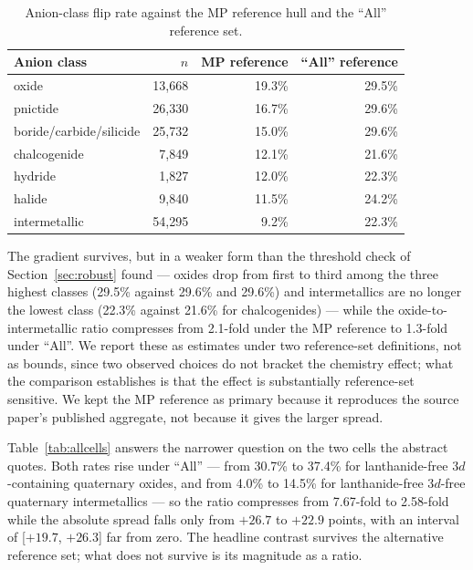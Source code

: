 \documentclass[11pt]{article}
\begin{document}
\begin{table}[htbp]\centering
\caption{Anion-class flip rate against the MP reference hull and the ``All'' reference set.}
\label{tab:allref}
\small\begin{tabular}{lrrr}
\toprule
Anion class & $n$ & MP reference & ``All'' reference \\
\midrule
oxide                   & 13{,}668 & 19.3\% & 29.5\% \\
pnictide                & 26{,}330 & 16.7\% & 29.6\% \\
boride/carbide/silicide & 25{,}732 & 15.0\% & 29.6\% \\
chalcogenide            & \phantom{0}7{,}849 & 12.1\% & 21.6\% \\
hydride                 & \phantom{0}1{,}827 & 12.0\% & 22.3\% \\
halide                  & \phantom{0}9{,}840 & 11.5\% & 24.2\% \\
intermetallic           & 54{,}295 & \phantom{0}9.2\% & 22.3\% \\
\bottomrule
\end{tabular}
\end{table}

The gradient survives, but in a weaker form than the threshold check of
Section~\ref{sec:robust} found --- oxides drop from first to third among the three
highest classes (29.5\% against 29.6\% and 29.6\%) and intermetallics are no longer the
lowest class (22.3\% against 21.6\% for chalcogenides) --- while the
oxide-to-intermetallic ratio compresses from 2.1-fold under the MP reference to 1.3-fold
under ``All''. We report these as estimates under two reference-set definitions, not as
bounds, since two observed choices do not bracket the chemistry effect; what the
comparison establishes is that the effect is substantially reference-set sensitive. We
kept the MP reference as primary because it reproduces the source paper's published aggregate,
not because it gives the larger spread.

Table~\ref{tab:allcells} answers the narrower question on the two cells the abstract
quotes. Both rates rise under ``All'' --- from 30.7\% to 37.4\% for lanthanide-free
3$d$-containing quaternary oxides, and from 4.0\% to 14.5\% for lanthanide-free 3$d$-free
quaternary intermetallics --- so the ratio compresses from 7.67-fold to 2.58-fold while
the absolute spread falls only from $+26.7$ to $+22.9$ points, with an interval of
[$+19.7$, $+26.3$] far from zero. The headline contrast survives the alternative
reference set; what does not survive is its magnitude as a ratio.
\end{document}
